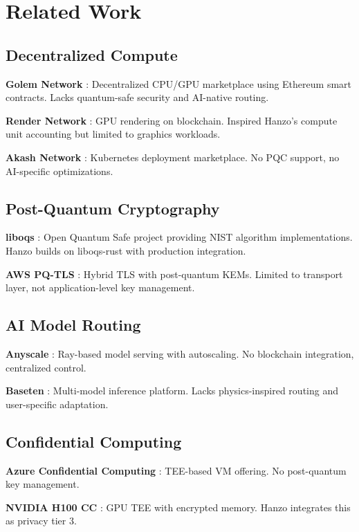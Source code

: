 \documentclass[11pt,twocolumn]{article}
\begin{document}
\section{Related Work}

\subsection{Decentralized Compute}

\textbf{Golem Network} \cite{golem}: Decentralized CPU/GPU marketplace using Ethereum smart contracts. Lacks quantum-safe security and AI-native routing.

\textbf{Render Network} \cite{render}: GPU rendering on blockchain. Inspired Hanzo's compute unit accounting but limited to graphics workloads.

\textbf{Akash Network} \cite{akash}: Kubernetes deployment marketplace. No PQC support, no AI-specific optimizations.

\subsection{Post-Quantum Cryptography}

\textbf{liboqs} \cite{liboqs}: Open Quantum Safe project providing NIST algorithm implementations. Hanzo builds on liboqs-rust with production integration.

\textbf{AWS PQ-TLS} \cite{awspqtls}: Hybrid TLS with post-quantum KEMs. Limited to transport layer, not application-level key management.

\subsection{AI Model Routing}

\textbf{Anyscale} \cite{anyscale}: Ray-based model serving with autoscaling. No blockchain integration, centralized control.

\textbf{Baseten} \cite{baseten}: Multi-model inference platform. Lacks physics-inspired routing and user-specific adaptation.

\subsection{Confidential Computing}

\textbf{Azure Confidential Computing} \cite{azurecc}: TEE-based VM offering. No post-quantum key management.

\textbf{NVIDIA H100 CC} \cite{h100cc}: GPU TEE with encrypted memory. Hanzo integrates this as privacy tier 3.
\end{document}
